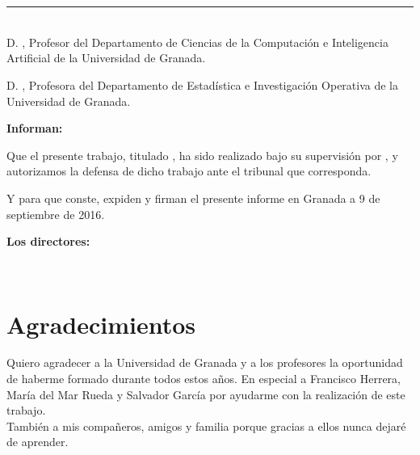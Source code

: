 \chapter*{}
\thispagestyle{empty}

\noindent\rule[-1ex]{\textwidth}{2pt}\\[4.5ex]

D. \textbf{ \myProf }, Profesor del Departamento de Ciencias de la Computación e Inteligencia Artificial de la Universidad de Granada.

\vspace{0.5cm}

D. \textbf{ \myOtherProf}, Profesora del Departamento de Estadística e Investigación Operativa de la Universidad de Granada.


\vspace{0.5cm}

\textbf{Informan:}

\vspace{0.5cm}

Que el presente trabajo, titulado \textit{\textbf{\myTitle}},
ha sido realizado bajo su supervisión por \textbf{\myName}, y autorizamos la defensa de dicho trabajo ante el tribunal
que corresponda.

\vspace{0.5cm}

Y para que conste, expiden y firman el presente informe en Granada a 9 de septiembre de 2016.

\vspace{1cm}

\textbf{Los directores:}

\vspace{5cm}

\noindent \textbf{\myProf \ \ \ \ \ \ \myOtherProf}

\chapter*{Agradecimientos}
\thispagestyle{empty}

       \vspace{1cm}


	Quiero agradecer a la Universidad de Granada y a los profesores la oportunidad de haberme formado durante todos estos años. En especial a Francisco Herrera, María del Mar Rueda y Salvador García por ayudarme con la realización de este trabajo.\\
	También a mis compañeros, amigos y familia porque gracias a ellos nunca dejaré de aprender.
